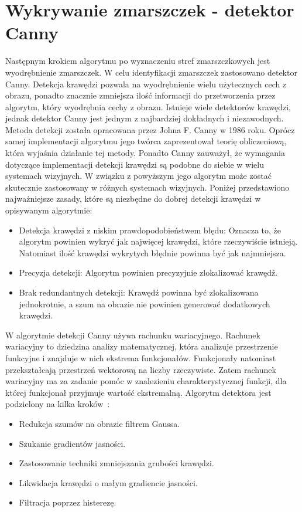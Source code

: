 \documentclass[a4paper,twoside,12pt]{book}
\begin{document}
    \section{Wykrywanie zmarszczek - detektor Canny}\label{sec:wykrywanie-zmarszczek---detektor-canny}
    Następnym krokiem algorytmu po wyznaczeniu stref zmarszczkowych jest wyodrębnienie zmarszczek.
    W celu identyfikacji zmarszczek zastosowano detektor Canny.
    Detekcja krawędzi pozwala na wyodrębnienie wielu użytecznych cech z obrazu,
    ponadto znacznie zmniejsza ilość informacji do przetworzenia przez algorytm,
    który wyodrębnia cechy z obrazu.
    Istnieje wiele detektorów krawędzi,
    jednak detektor Canny jest jednym z najbardziej dokładnych i niezawodnych.
    Metoda detekcji została opracowana przez Johna F. Canny w 1986 roku.
    Oprócz samej implementacji algorytmu jego twórca zaprezentował teorię obliczeniową,
    która wyjaśnia działanie tej metody. Ponadto Canny zauważył,
    że wymagania dotyczące implementacji detekcji krawędzi są podobne do siebie w wielu systemach wizyjnych.
    W związku z powyższym jego algorytm może zostać skutecznie zastosowany w różnych systemach wizyjnych.
    Poniżej przedstawiono najważniejsze zasady,
    które są niezbędne do dobrej detekcji krawędzi w opisywanym algorytmie:
    \begin{itemize}
        \item Detekcja krawędzi z niskim prawdopodobieństwem błędu:
        Oznacza to, że algorytm powinien wykryć jak najwięcej krawędzi, które rzeczywiście istnieją.
        Natomiast ilość krawędzi wykrytych błędnie powinna być jak najmniejsza.
        \item Precyzja detekcji: Algorytm powinien precyzyjnie zlokalizować krawędź.
        \item Brak redundantnych detekcji:
        Krawędź powinna być zlokalizowana jednokrotnie,
        a szum na obrazie nie powinien generować dodatkowych krawędzi.
    \end{itemize}
    W algorytmie detekcji Canny używa rachunku wariacyjnego.
    Rachunek wariacyjny to dziedzina analizy matematycznej, która
    analizuje przestrzenie funkcyjne i znajduje w nich ekstrema funkcjonałów.
    Funkcjonały natomiast przekształcają przestrzeń wektorową na liczby rzeczywiste.
    Zatem rachunek wariacyjny ma za zadanie pomóc w znalezieniu charakterystycznej funkcji,
    dla której funkcjonał przyjmuje wartość ekstremalną.
    Algorytm detektora jest podzielony na kilka kroków~\cite{Canny}:
    \begin{itemize}
        \item Redukcja szumów na obrazie filtrem Gaussa.
        \item Szukanie gradientów jasności.
        \item Zastosowanie techniki zmniejszania grubości krawędzi.
        \item Likwidacja krawędzi o małym gradiencie jasności.
        \item Filtracja poprzez histerezę.
    \end{itemize}
\end{document}
